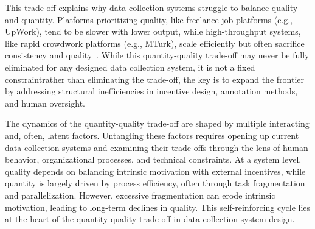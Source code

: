 This trade-off explains why data collection systems struggle to balance quality and quantity. Platforms prioritizing quality, like freelance job platforms (e.g., UpWork), tend to be slower with lower output, while high-throughput systems, like rapid crowdwork platforms (e.g., MTurk), scale efficiently but often sacrifice consistency and quality~\cite{douglas2023data}. While this quantity-quality trade-off may never be fully eliminated for any designed data collection system, it is not a fixed constraint\textemdash{}rather than eliminating the trade-off, the key is to expand the frontier by addressing structural inefficiencies in incentive design, annotation methods, and human oversight.

The dynamics of the quantity-quality trade-off are shaped by multiple interacting and, often, latent factors. Untangling these factors requires opening up current data collection systems and examining their trade-offs through the lens of human behavior, organizational processes, and technical constraints. At a system level, quality depends on balancing intrinsic motivation with external incentives, while quantity is largely driven by process efficiency, often through task fragmentation and parallelization. However, excessive fragmentation can erode intrinsic motivation, leading to long-term declines in quality. This self-reinforcing cycle lies at the heart of the quantity-quality trade-off in data collection system design. 
